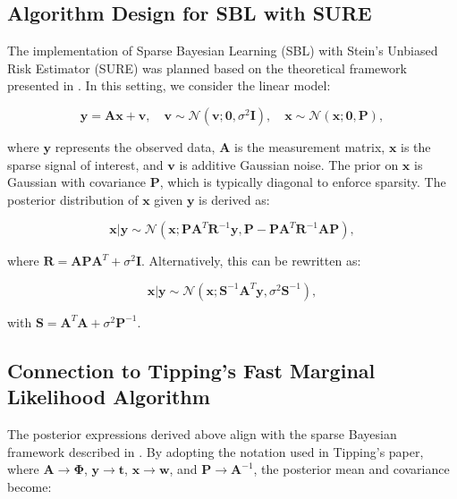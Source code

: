 \documentclass{article}
\begin{document}
\subsection{Algorithm Design for SBL with SURE}
The implementation of Sparse Bayesian Learning (SBL) with Stein's Unbiased Risk Estimator (SURE) was planned based on the theoretical framework presented in \citet{slockSURE}. In this setting, we consider the linear model:

\begin{equation}
    \mathbf{y} = \mathbf{A}\mathbf{x} + \mathbf{v}, \quad \mathbf{v} \sim \mathcal{N}(\mathbf{v}; \mathbf{0}, \sigma^2 \mathbf{I}), \quad \mathbf{x} \sim \mathcal{N}(\mathbf{x}; \mathbf{0}, \mathbf{P}),
\end{equation}

where $\mathbf{y}$ represents the observed data, $\mathbf{A}$ is the measurement matrix, $\mathbf{x}$ is the sparse signal of interest, and $\mathbf{v}$ is additive Gaussian noise. The prior on $\mathbf{x}$ is Gaussian with covariance $\mathbf{P}$, which is typically diagonal to enforce sparsity. The posterior distribution of $\mathbf{x}$ given $\mathbf{y}$ is derived as:

\begin{equation}
    \mathbf{x}|\mathbf{y} \sim \mathcal{N}\left(\mathbf{x}; \mathbf{P}\mathbf{A}^T\mathbf{R}^{-1}\mathbf{y}, \mathbf{P} - \mathbf{P}\mathbf{A}^T\mathbf{R}^{-1}\mathbf{A}\mathbf{P}\right),
\end{equation}

where $\mathbf{R} = \mathbf{A}\mathbf{P}\mathbf{A}^T + \sigma^2 \mathbf{I}$. Alternatively, this can be rewritten as:

\begin{equation}
    \mathbf{x}|\mathbf{y} \sim \mathcal{N}\left(\mathbf{x}; \mathbf{S}^{-1}\mathbf{A}^T\mathbf{y}, \sigma^2 \mathbf{S}^{-1}\right),
\end{equation}

with $\mathbf{S} = \mathbf{A}^T\mathbf{A} + \sigma^2 \mathbf{P}^{-1}$. 

\subsection{Connection to Tipping's Fast Marginal Likelihood Algorithm}
The posterior expressions derived above align with the sparse Bayesian framework described in \citet{tipp2003fastsb}. By adopting the notation used in Tipping's paper, where $\mathbf{A} \rightarrow \boldsymbol{\Phi}$, $\mathbf{y} \rightarrow \mathbf{t}$, $\mathbf{x} \rightarrow \mathbf{w}$, and $\mathbf{P} \rightarrow \mathbf{A}^{-1}$, the posterior mean and covariance become:
\end{document}

